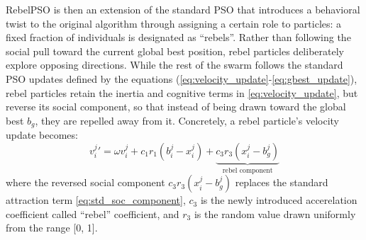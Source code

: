 {RebelPSO is then an extension of the standard PSO that introduces a behavioral twist to the original algorithm through assigning a certain role to particles: a fixed fraction of individuals is designated as ``rebels''. 
Rather than following the social pull toward the current global best position, rebel particles deliberately explore opposing directions.
While the rest of the swarm follows the standard PSO updates defined by the equations (\ref{eq:velocity_update}-\ref{eq:gbest_update}), rebel particles
retain the inertia and cognitive terms in \eqref{eq:velocity_update}, but reverse its social component, so that instead of being drawn toward the global best $b_g$, they are repelled away from it. Concretely, a rebel particle's velocity update becomes:
% 
\begin{equation}\label{eq:velocity_update_rebel}
v_{i}^{j}{}'= \omega v_{i}^{j} +
c_1 r_1 (b_{i}^{j} - x_{i}^{j}) +
\underbrace{c_3 r_3 (x_{i}^{j} - b_{g}^{j})}_{\text{rebel component}}
\end{equation}
where the reversed social component $c_3 r_3 (x_{i}^{j} - b_{g}^{j})$ replaces the standard attraction term \eqref{eq:std_soc_component}, $c_3$ is the newly introduced accerelation coefficient called ``rebel'' coefficient, and $r_3$ is the random value drawn uniformly from the range [0, 1].

\begin{figure}[H]
    \centering
\end{figure}}
